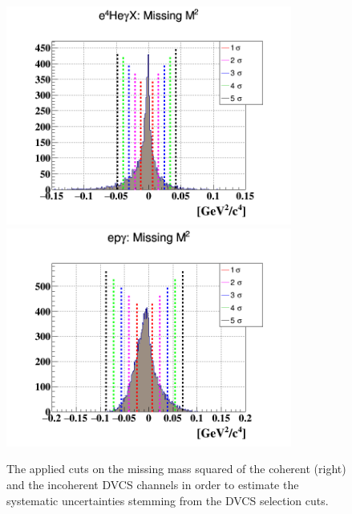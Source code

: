 \begin{figure}[h!]
\hspace{-1.0cm}
   \includegraphics[height=7.2cm]{fig/e4Hegamma_M2_Mis_sig.png}
   \includegraphics[height=7.2cm]{fig/epgamma_M2_Mis_sig.png}
   \caption{The applied cuts on the missing mass squared  of the coherent 
(right) and the incoherent DVCS channels in order to estimate the systematic 
uncertainties stemming from the DVCS selection cuts. }
\label{fig:MM2_sys_cuts}
\end{figure}


